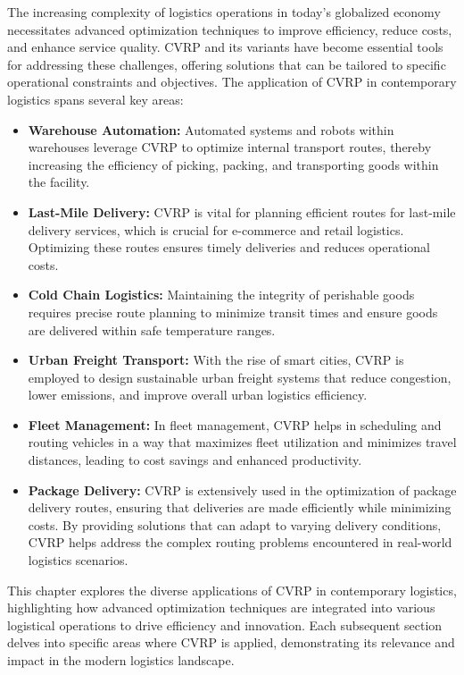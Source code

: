 \documentclass[
]{article}
\begin{document}
    The increasing complexity of logistics operations in today's globalized economy necessitates advanced optimization techniques to improve efficiency, reduce costs, and enhance service quality. CVRP and its variants have become essential tools for addressing these challenges, offering solutions that can be tailored to specific operational constraints and objectives. The application of CVRP in contemporary logistics spans several key areas:

    \begin{itemize}
        \item \textbf{Warehouse Automation:} Automated systems and robots within warehouses leverage CVRP to optimize internal transport routes, thereby increasing the efficiency of picking, packing, and transporting goods within the facility.
        \item \textbf{Last-Mile Delivery:} CVRP is vital for planning efficient routes for last-mile delivery services, which is crucial for e-commerce and retail logistics. Optimizing these routes ensures timely deliveries and reduces operational costs.
        \item \textbf{Cold Chain Logistics:} Maintaining the integrity of perishable goods requires precise route planning to minimize transit times and ensure goods are delivered within safe temperature ranges.
        \item \textbf{Urban Freight Transport:} With the rise of smart cities, CVRP is employed to design sustainable urban freight systems that reduce congestion, lower emissions, and improve overall urban logistics efficiency.
        \item \textbf{Fleet Management:} In fleet management, CVRP helps in scheduling and routing vehicles in a way that maximizes fleet utilization and minimizes travel distances, leading to cost savings and enhanced productivity.
        \item \textbf{Package Delivery:} CVRP is extensively used in the optimization of package delivery routes, ensuring that deliveries are made efficiently while minimizing costs. By providing solutions that can adapt to varying delivery conditions, CVRP helps address the complex routing problems encountered in real-world logistics scenarios.
    \end{itemize}

    This chapter explores the diverse applications of CVRP in contemporary logistics, highlighting how advanced optimization techniques are integrated into various logistical operations to drive efficiency and innovation. Each subsequent section delves into specific areas where CVRP is applied, demonstrating its relevance and impact in the modern logistics landscape.
\end{document}
